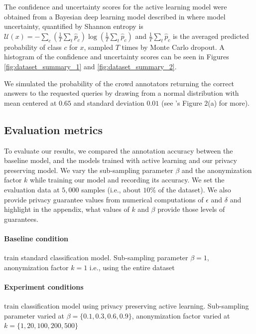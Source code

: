 \documentclass[letterpaper]{article}
\begin{document}
The confidence and uncertainty scores for the active learning model were obtained from a Bayesian deep learning model described in \cite{yang2018leveraging} where model uncertainty, quantified by Shannon entropy is $\mathcal{U}(x) = -\sum_{c}(\frac{1}{T}\sum_{t} \hat{p}_{c}) \log (\frac{1}{T}\sum_{t} \hat{p}_{c})$ and $\frac{1}{T}\sum_{t} \hat{p}_{c}$ is the averaged predicted probability of class $c$ for $x$, sampled $T$ times by Monte Carlo dropout. A histogram of the confidence and uncertainty scores can be seen in Figures \ref{fig:dataset_summary_1} and \ref{fig:dataset_summary_2}.

We simulated the probability of the crowd annotators returning the correct answers to the requested queries by drawing from a normal distribution with mean centered at $0.65$ and standard deviation $0.01$ (see \cite{yang2018leveraging}'s Figure $2$(a) for more).




\subsection{Evaluation metrics}
To evaluate our results, we compared the annotation accuracy between the baseline model, and the models trained with active learning and our privacy preserving model. We vary the sub-sampling parameter $\beta$ and the anonymization factor $k$ while training our model and recording its accuracy. We set the evaluation data at $5,000$ samples (i.e., about $10$\% of the dataset). We also provide privacy guarantee values from numerical computations of $\epsilon$ and $\delta$ and highlight in the appendix, what values of $k$ and $\beta$ provide those levels of guarantees.



\paragraph{Baseline condition} train standard classification model. Sub-sampling parameter $\beta = 1$, anonymization factor $k = 1$ i.e., using the entire dataset


\paragraph{Experiment conditions} train classification model using privacy preserving active learning. Sub-sampling parameter varied at $\beta = \{0.1, 0.3, 0.6, 0.9\}$, anonymization factor varied at $k = \{1, 20, 100, 200, 500\}$
\end{document}
